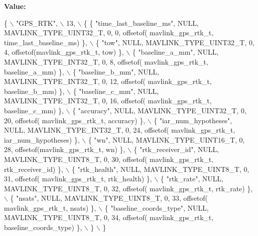 {\bfseries Value\+:}
\begin{DoxyCode}
\{ \(\backslash\)
    \textcolor{stringliteral}{"GPS\_RTK"}, \(\backslash\)
    13, \(\backslash\)
    \{  \{ \textcolor{stringliteral}{"time\_last\_baseline\_ms"}, NULL, MAVLINK_TYPE_UINT32_T, 0, 0, offsetof(
      mavlink_gps_rtk_t, time\_last\_baseline\_ms) \}, \(\backslash\)
         \{ \textcolor{stringliteral}{"tow"}, NULL, MAVLINK_TYPE_UINT32_T, 0, 4, offsetof(mavlink_gps_rtk_t, tow) \}, \(\backslash\)
         \{ \textcolor{stringliteral}{"baseline\_a\_mm"}, NULL, MAVLINK_TYPE_INT32_T, 0, 8, offsetof(
      mavlink_gps_rtk_t, baseline\_a\_mm) \}, \(\backslash\)
         \{ \textcolor{stringliteral}{"baseline\_b\_mm"}, NULL, MAVLINK_TYPE_INT32_T, 0, 12, offsetof(
      mavlink_gps_rtk_t, baseline\_b\_mm) \}, \(\backslash\)
         \{ \textcolor{stringliteral}{"baseline\_c\_mm"}, NULL, MAVLINK_TYPE_INT32_T, 0, 16, offsetof(
      mavlink_gps_rtk_t, baseline\_c\_mm) \}, \(\backslash\)
         \{ \textcolor{stringliteral}{"accuracy"}, NULL, MAVLINK_TYPE_UINT32_T, 0, 20, offsetof(
      mavlink_gps_rtk_t, accuracy) \}, \(\backslash\)
         \{ \textcolor{stringliteral}{"iar\_num\_hypotheses"}, NULL, MAVLINK_TYPE_INT32_T, 0, 24, offsetof(
      mavlink_gps_rtk_t, iar\_num\_hypotheses) \}, \(\backslash\)
         \{ \textcolor{stringliteral}{"wn"}, NULL, MAVLINK_TYPE_UINT16_T, 0, 28, offsetof(mavlink_gps_rtk_t, wn) \}, \(\backslash\)
         \{ \textcolor{stringliteral}{"rtk\_receiver\_id"}, NULL, MAVLINK_TYPE_UINT8_T, 0, 30, offsetof(
      mavlink_gps_rtk_t, rtk\_receiver\_id) \}, \(\backslash\)
         \{ \textcolor{stringliteral}{"rtk\_health"}, NULL, MAVLINK_TYPE_UINT8_T, 0, 31, offsetof(
      mavlink_gps_rtk_t, rtk\_health) \}, \(\backslash\)
         \{ \textcolor{stringliteral}{"rtk\_rate"}, NULL, MAVLINK_TYPE_UINT8_T, 0, 32, offsetof(
      mavlink_gps_rtk_t, rtk\_rate) \}, \(\backslash\)
         \{ \textcolor{stringliteral}{"nsats"}, NULL, MAVLINK_TYPE_UINT8_T, 0, 33, offsetof(
      mavlink_gps_rtk_t, nsats) \}, \(\backslash\)
         \{ \textcolor{stringliteral}{"baseline\_coords\_type"}, NULL, MAVLINK_TYPE_UINT8_T, 0, 34, offsetof(
      mavlink_gps_rtk_t, baseline\_coords\_type) \}, \(\backslash\)
         \} \(\backslash\)
\}
\end{DoxyCode}
\mbox{\label{mavlink__msg__gps__rtk_8h_a8a992cb249a1ca4da66dfd739c4dde2f}} 

